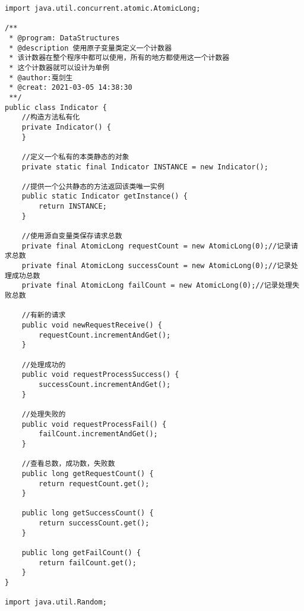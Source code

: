 \documentclass[a4paper]{report}
\begin{document}
\begin{Verbatim}[frame=single,numbersep=5pt,xleftmargin=1.5em,xrightmargin=1.5em]
import java.util.concurrent.atomic.AtomicLong;

/**
 * @program: DataStructures
 * @description 使用原子变量类定义一个计数器
 * 该计数器在整个程序中都可以使用，所有的地方都使用这一个计数器
 * 这个计数器就可以设计为单例
 * @author:戛剑生
 * @creat: 2021-03-05 14:38:30
 **/
public class Indicator {
    //构造方法私有化
    private Indicator() {
    }

    //定义一个私有的本类静态的对象
    private static final Indicator INSTANCE = new Indicator();

    //提供一个公共静态的方法返回该类唯一实例
    public static Indicator getInstance() {
        return INSTANCE;
    }

    //使用源自变量类保存请求总数
    private final AtomicLong requestCount = new AtomicLong(0);//记录请求总数
    private final AtomicLong successCount = new AtomicLong(0);//记录处理成功总数
    private final AtomicLong failCount = new AtomicLong(0);//记录处理失败总数

    //有新的请求
    public void newRequestReceive() {
        requestCount.incrementAndGet();
    }

    //处理成功的
    public void requestProcessSuccess() {
        successCount.incrementAndGet();
    }

    //处理失败的
    public void requestProcessFail() {
        failCount.incrementAndGet();
    }

    //查看总数，成功数，失败数
    public long getRequestCount() {
        return requestCount.get();
    }

    public long getSuccessCount() {
        return successCount.get();
    }

    public long getFailCount() {
        return failCount.get();
    }
}

import java.util.Random;


\end{Verbatim}
\end{document}
